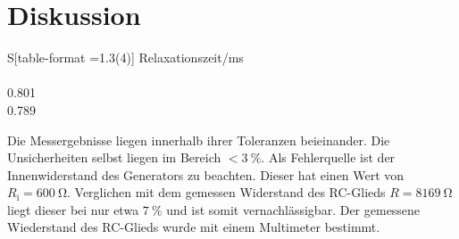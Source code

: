 \section{Diskussion}
\label{sec:Diskussion}
\begin{table}[H]
  \centering
  \begin{tabular}{S[table-format =1.3(4)]}
    \toprule
    {Relaxationszeit/\si{\milli\second}}\\
     \\
    0.801 \\
    0.789\\
    \bottomrule
  \end{tabular}
\end{table}
\noindent
Die Messergebnisse liegen innerhalb ihrer Toleranzen beieinander. Die Unsicherheiten selbst liegen im Bereich $<\SI{3}{\percent}$.
Als Fehlerquelle ist der Innenwiderstand des Generators zu beachten. Dieser hat einen Wert von $R_\text{i} = \SI{600}{\ohm}$. Verglichen mit dem gemessen Widerstand des RC-Glieds $R=\SI{8169}{\ohm}$ liegt dieser bei nur etwa $\SI{7}{\percent}$ und ist somit vernachlässigbar.
Der gemessene Wiederstand des RC-Glieds wurde mit einem Multimeter bestimmt.
